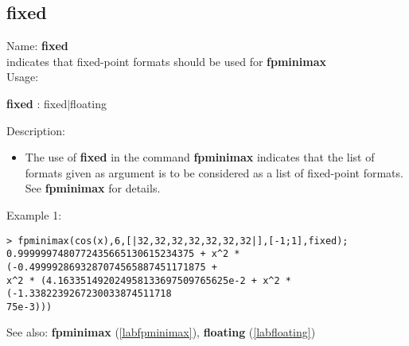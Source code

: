 \subsection{fixed}
\label{labfixed}
\noindent Name: \textbf{fixed}\\
indicates that fixed-point formats should be used for \textbf{fpminimax}\\

\noindent Usage: 
\begin{center}
\textbf{fixed} : \textsf{fixed$|$floating}\\
\end{center}
\noindent Description: \begin{itemize}

\item The use of \textbf{fixed} in the command \textbf{fpminimax} indicates that the list of
   formats given as argument is to be considered as a list of fixed-point
   formats.
   See \textbf{fpminimax} for details.
\end{itemize}
\noindent Example 1: 
\begin{center}\begin{minipage}{15cm}\begin{Verbatim}[frame=single]
> fpminimax(cos(x),6,[|32,32,32,32,32,32,32|],[-1;1],fixed);
0.9999997480772435665130615234375 + x^2 * (-0.4999928693287074565887451171875 + 
x^2 * (4.163351492024958133697509765625e-2 + x^2 * (-1.3382239267230033874511718
75e-3)))
\end{Verbatim}
\end{minipage}\end{center}
See also: \textbf{fpminimax} (\ref{labfpminimax}), \textbf{floating} (\ref{labfloating})
